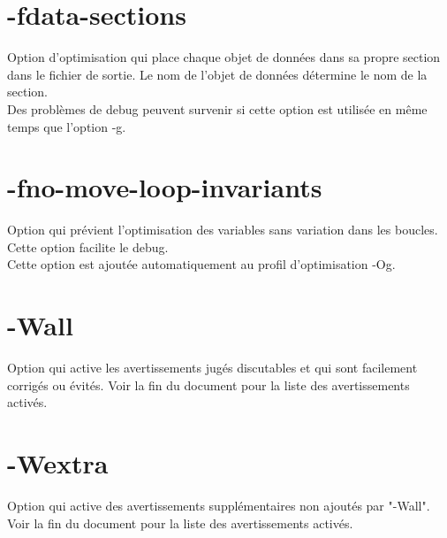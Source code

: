 \documentclass[headings=appendixprefix]{scrreprt}
\begin{document}

\section{-fdata-sections}

Option d'optimisation qui place chaque objet de données dans sa propre section dans le fichier de sortie. Le nom de l'objet de données détermine le nom de la section.\\

Des problèmes de debug peuvent survenir si cette option est utilisée en même temps que l'option -g.\\


\section{-fno-move-loop-invariants}

Option qui prévient l'optimisation des variables sans variation dans les boucles. Cette option facilite le debug.\\

Cette option est ajoutée automatiquement au profil d'optimisation -Og.\\


\section{-Wall}

Option qui active les avertissements jugés discutables et qui sont facilement corrigés ou évités. Voir la fin du document pour la liste des avertissements activés.\\ 


\section{-Wextra}

Option qui active des avertissements supplémentaires non ajoutés par "-Wall". Voir la fin du document pour la liste des avertissements activés.\\

\end{document}
